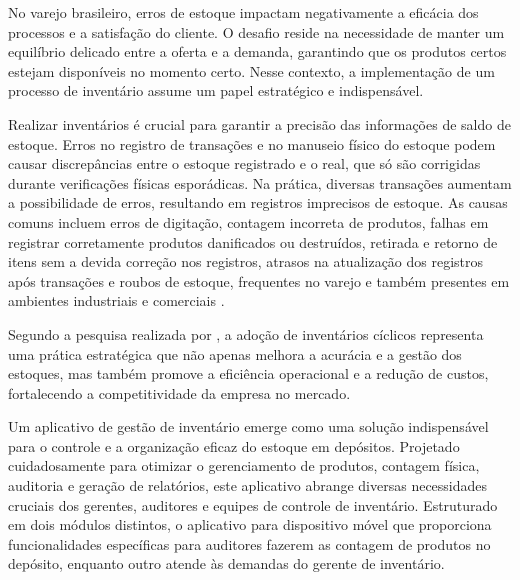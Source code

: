 
No varejo brasileiro, erros de estoque impactam negativamente a eficácia dos processos e a satisfação do cliente.
O desafio reside na necessidade de manter um equilíbrio delicado entre a oferta e a demanda, garantindo que os produtos certos estejam disponíveis no momento certo. Nesse contexto, a implementação de um processo de inventário assume um papel estratégico e indispensável.


Realizar inventários é crucial para garantir a precisão das informações de saldo de estoque. Erros no registro de transações e no manuseio físico do estoque podem causar discrepâncias entre o estoque registrado e o real, que só são corrigidas durante verificações físicas esporádicas. Na prática, diversas transações aumentam a possibilidade de erros, resultando em registros imprecisos de estoque. As causas comuns incluem erros de digitação, contagem incorreta de produtos, falhas em registrar corretamente produtos danificados ou destruídos, retirada e retorno de itens sem a devida correção nos registros, atrasos na atualização dos registros após transações e roubos de estoque, frequentes no varejo e também presentes em ambientes industriais e comerciais \cite{nigel}.

Segundo a pesquisa realizada por \cite{silva}, a adoção de inventários cíclicos representa uma prática estratégica que não apenas melhora a acurácia e a gestão dos estoques, mas também promove a eficiência operacional e a redução de custos, fortalecendo a competitividade da empresa no mercado.


Um aplicativo de gestão de inventário emerge como uma solução indispensável para o controle e a organização eficaz do estoque em depósitos. Projetado cuidadosamente para otimizar o gerenciamento de produtos, contagem física, auditoria e geração de relatórios, este aplicativo abrange diversas necessidades cruciais dos gerentes, auditores e equipes de controle de inventário. Estruturado em dois módulos distintos, o aplicativo para dispositivo móvel que proporciona funcionalidades específicas para auditores fazerem as contagem de produtos no depósito, enquanto outro atende às demandas do gerente de inventário.

